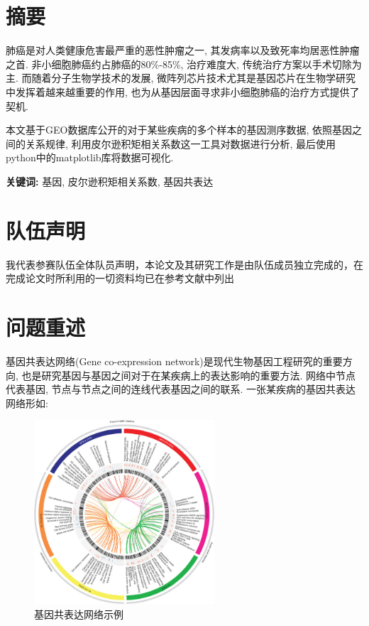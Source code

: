 \documentclass[zihao=-4]{ctexart}
\begin{document}
\normalsize
\renewcommand{\headrulewidth}{0pt}%
\newpage
\section*{摘要}

肺癌是对人类健康危害最严重的恶性肿瘤之一, 其发病率以及致死率均居恶性肿瘤之首. 非小细胞肺癌约占肺癌的80\%-85\%, 治疗难度大, 传统治疗方案以手术切除为主. 而随着分子生物学技术的发展, 微阵列芯片技术尤其是基因芯片在生物学研究中发挥着越来越重要的作用, 也为从基因层面寻求非小细胞肺癌的治疗方式提供了契机. 

本文基于GEO数据库公开的对于某些疾病的多个样本的基因测序数据, 依照基因之间的关系规律, 利用皮尔逊积矩相关系数这一工具对数据进行分析, 最后使用python中的matplotlib库将数据可视化.

\textbf{关键词:} 基因, 皮尔逊积矩相关系数, 基因共表达

\newpage

\section*{队伍声明}

我代表参赛队伍全体队员声明，本论文及其研究工作是由队伍成员独立完成的，在完成论文时所利用的一切资料均已在参考文献中列出 
\newpage
\renewcommand{\headrulewidth}{0.4pt} %
\setcounter{page}{1} 

\tableofcontents

\section{问题重述}
基因共表达网络(Gene co-expression network)是现代生物基因工程研究的重要方向, 也是研究基因与基因之间对于在某疾病上的表达影响的重要方法. 网络中节点代表基因, 节点与节点之间的连线代表基因之间的联系. 一张某疾病的基因共表达网络形如:
\begin{figure}[H]
    \centering
    \includegraphics[width=0.6\textwidth]{pic/example.jpg}
    \caption{基因共表达网络示例\cite{example}}
\end{figure}
\end{document}
